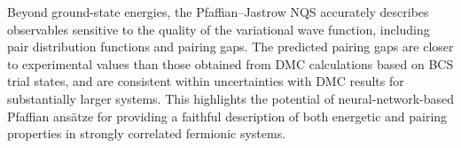 Beyond ground-state energies, the Pfaffian--Jastrow NQS accurately describes observables sensitive to the quality of the variational wave function, including pair distribution functions and pairing gaps. The predicted pairing gaps are closer to experimental values than those obtained from DMC calculations based on BCS trial states, and are consistent within uncertainties with DMC results for substantially larger systems. This highlights the potential of neural-network-based Pfaffian ans\"atze for providing a faithful description of both energetic and pairing properties in strongly correlated fermionic systems.




